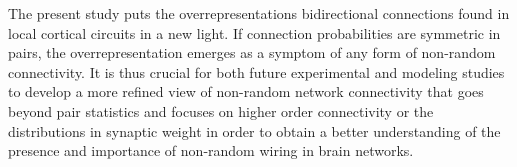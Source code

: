 The present study puts the overrepresentations bidirectional connections found in local cortical circuits in a new light. If connection probabilities are symmetric in pairs, the overrepresentation emerges as a symptom of any form of non-random connectivity. It is thus crucial for both future experimental and modeling studies to develop a more refined view of non-random network connectivity that goes beyond pair statistics and focuses on higher order connectivity or the distributions in synaptic weight in order to obtain a better understanding of the presence and importance of non-random wiring in brain networks.













